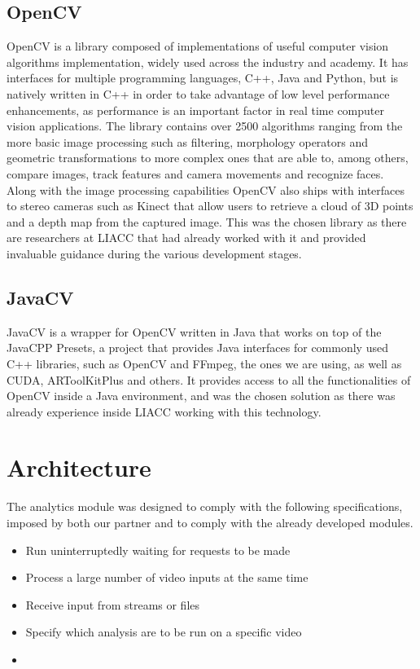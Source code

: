 \subsection{OpenCV}
OpenCV is a library composed of implementations of useful computer vision algorithms implementation, widely used across the industry and academy. It has interfaces for multiple programming languages, C++, Java and Python, but is natively written in C++ in order to take advantage of low level performance enhancements, as performance is an important factor in real time computer vision applications.
The library contains over 2500 algorithms ranging from the more basic image processing such as filtering, morphology operators and geometric transformations to more complex ones that are able to, among others, compare images, track features and camera movements and recognize faces. Along with the image processing capabilities OpenCV also ships with interfaces to stereo cameras such as Kinect that allow users to retrieve a cloud of 3D points and a depth map from the captured image. This was the chosen library as there are researchers at LIACC that had already worked with it and provided invaluable guidance during the various development stages.

\subsection{JavaCV}
JavaCV is a wrapper for OpenCV written in Java that works on top of the JavaCPP Presets, a project that provides Java interfaces for commonly used C++ libraries, such as OpenCV and FFmpeg, the ones we are using, as well as CUDA, ARToolKitPlus and others. It provides access to all the functionalities of OpenCV inside a Java environment, and was the chosen solution as there was already experience inside LIACC working with this technology.

\section{Architecture}


The analytics module was designed to comply with the following specifications, imposed by both our partner and to comply with the already developed modules. 

\begin{itemize}
	\item Run uninterruptedly waiting for requests to be made
	\item Process a large number of video inputs at the same time
	\item Receive input from streams or files
	\item Specify which analysis are to be run on a specific video
	\item
\end{itemize}

